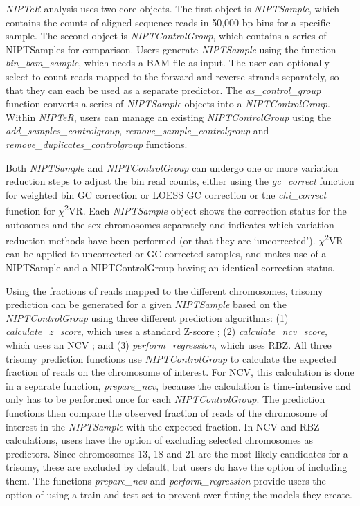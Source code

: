 \textsl{NIPTeR} analysis uses two core objects. 
The first object is \textsl{NIPTSample}, which contains the counts of aligned sequence reads in 50,000 bp bins for a specific sample. 
The second object is \textsl{NIPTControlGroup}, which contains a series of NIPTSamples for comparison. Users generate \textsl{NIPTSample} using the function \textsl{bin\_bam\_sample}, which needs a BAM file \cite{Li_2009} as input. 
The user can optionally select to count reads mapped to the forward and reverse strands separately, so that they can each be used as a separate predictor. 
The \textsl{as\_control\_group} function converts a series of \textsl{NIPTSample} objects into a \textsl{NIPTControlGroup}. 
Within \textsl{NIPTeR}, users can manage an existing \textsl{NIPTControlGroup} using the \textsl{add\_samples\_controlgroup}, \textsl{remove\_sample\_controlgroup} and \textsl{remove\_duplicates\_controlgroup} functions.

Both \textsl{NIPTSample} and \textsl{NIPTControlGroup} can undergo one or more variation reduction steps to adjust the bin read counts, either using the \textsl{gc\_correct} function for weighted bin GC correction \cite{Fan_2010} or LOESS GC correction \cite{Chen_2011} or the \textsl{chi\_correct} function for $\chi$\textsuperscript{2}VR. 
Each \textsl{NIPTSample} object shows the correction status for the autosomes and the sex chromosomes separately and indicates which variation reduction methods have been performed (or that they are ‘uncorrected’). 
$\chi$\textsuperscript{2}VR can be applied to uncorrected or GC-corrected samples, and makes use of a NIPTSample and a NIPTControlGroup having an identical correction status.

Using the fractions of reads mapped to the different chromosomes, trisomy prediction can be generated for a given \textsl{NIPTSample} based on the \textsl{NIPTControlGroup} using three different prediction algorithms: (1) \textsl{calculate\_z\_score}, which uses a standard Z-score \cite{Chiu_2008}; (2) \textsl{calculate\_ncv\_score}, which uses an NCV \cite{Sehnert_2011}; and (3) \textsl{perform\_regression}, which uses RBZ. 
All three trisomy prediction functions use \textsl{NIPTControlGroup} to calculate the expected fraction of reads on the chromosome of interest. 
For NCV, this calculation is done in a separate function, \textsl{prepare\_ncv}, because the calculation is time-intensive and only has to be performed once for each \textsl{NIPTControlGroup}. 
The prediction functions then compare the observed fraction of reads of the chromosome of interest in the \textsl{NIPTSample} with the expected fraction. 
In NCV and RBZ calculations, users have the option of excluding selected chromosomes as predictors. Since chromosomes 13, 18 and 21 are the most likely candidates for a trisomy, these are excluded by default, but users do have the option of including them. 
The functions \textsl{prepare\_ncv} and \textsl{perform\_regression} provide users the option of using a train and test set to prevent over-fitting the models they create.

